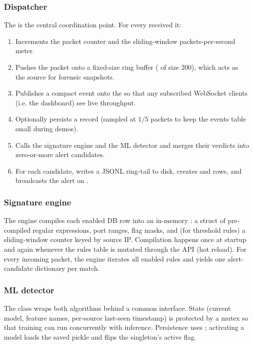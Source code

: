 \subsubsection{Dispatcher}

The  is the central coordination point. For every
received  it:
\begin{enumerate}
    \item Increments the packet counter and the sliding-window packets-per-second
        meter.
    \item Pushes the packet onto a fixed-size ring buffer (
        of size 200), which acts as the source for forensic snapshots.
    \item Publishes a compact event onto the  so that
        any subscribed WebSocket clients (i.e. the dashboard) see live
        throughput.
    \item Optionally persists a  record (sampled at
        $1/5$ packets to keep the events table small during demos).
    \item Calls the signature engine and the ML detector and merges
        their verdicts into zero-or-more alert candidates.
    \item For each candidate, writes a JSONL ring-tail to disk, creates
         and  rows, and broadcasts the
        alert on .
\end{enumerate}

\subsubsection{Signature engine}

The engine compiles each enabled DB row into an in-memory
: a struct of pre-compiled regular expressions,
port ranges, flag masks, and (for threshold rules) a sliding-window
counter keyed by source IP. Compilation happens once at startup and
again whenever the rules table is mutated through the API (hot reload).
For every incoming packet, the engine iterates all enabled rules and
yields one alert-candidate dictionary per match.

\subsubsection{ML detector}

The  class wraps both algorithms behind a common
 interface. State (current
model, feature names, per-source last-seen timestamp) is protected by a
mutex so that training can run concurrently with inference.
Persistence uses ; activating a model loads the saved
pickle and flips the singleton's active flag.

